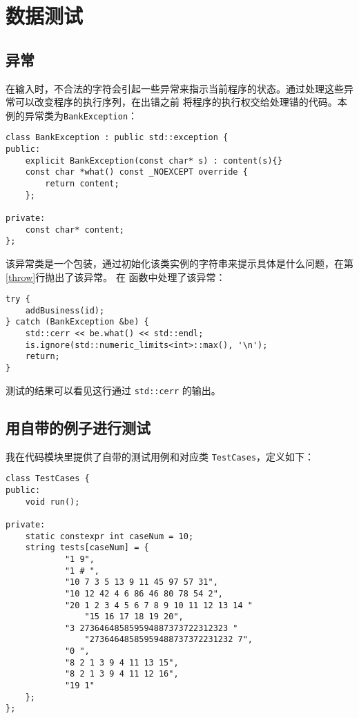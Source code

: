 
\chapter{数据测试}


\section{异常}
在输入时，不合法的字符会引起一些异常来指示当前程序的状态。通过处理这些异常可以改变程序的执行序列，在出错之前%
将程序的执行权交给处理错的代码。本例的异常类为\lstinline{BankException}：

\begin{lstlisting}[firstnumber=143, caption=BankException 异常类定义]
class BankException : public std::exception {
public:
    explicit BankException(const char* s) : content(s){}
    const char *what() const _NOEXCEPT override {
        return content;
    };

private:
    const char* content;
};
\end{lstlisting}

该异常类是一个包装，通过初始化该类实例的字符串来提示具体是什么问题，在第\ref{throw}行抛出了该异常。%
在 函数中处理了该异常：

\begin{lstlisting}[firstnumber=215]
try {
    addBusiness(id);
} catch (BankException &be) {
    std::cerr << be.what() << std::endl;
    is.ignore(std::numeric_limits<int>::max(), '\n');
    return;
}
\end{lstlisting}

测试的结果可以看见这行通过 \lstinline{std::cerr} 的输出。

\vspace*{0.8cm}

\section{用自带的例子进行测试}

我在代码模块里提供了自带的测试用例和对应类 \lstinline{TestCases}，定义如下：

\begin{lstlisting}[firstnumber=240, caption=测试类定义]
class TestCases {
public:
    void run();
    
private:
    static constexpr int caseNum = 10;
    string tests[caseNum] = {
            "1 9",
            "1 # ",
            "10 7 3 5 13 9 11 45 97 57 31",
            "10 12 42 4 6 86 46 80 78 54 2",
            "20 1 2 3 4 5 6 7 8 9 10 11 12 13 14 "
                "15 16 17 18 19 20",
            "3 273646485859594887373722312323 "
                "27364648585959488737372231232 7",
            "0 ",
            "8 2 1 3 9 4 11 13 15",
            "8 2 1 3 9 4 11 12 16",
            "19 1"
    };
};
\end{lstlisting}
\vspace*{12pt}

